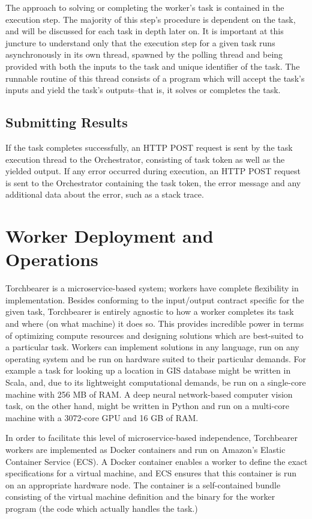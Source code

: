 The approach to solving or completing the worker’s task is contained in the execution step. The majority of this step’s procedure is dependent on the task, and will be discussed for each task in depth later on. It is important at this juncture to understand only that the execution step for a given task runs asynchronously in its own thread, spawned by the polling thread and being provided with both the inputs to the task and unique identifier of the task. The runnable routine of this thread consists of a program which will accept the task’s inputs and yield the task’s outputs--that is, it solves or completes the task. 

\subsection{Submitting Results}

If the task completes successfully, an HTTP POST request is sent by the task execution thread to the Orchestrator, consisting of task token as well as the yielded output. If any error occurred during execution, an HTTP POST request is sent to the Orchestrator containing the task token, the error message and any additional data about the error, such as a stack trace.

\section{Worker Deployment and Operations}
Torchbearer is a microservice-based system; workers have complete flexibility in implementation. Besides conforming to the input/output contract specific for the given task, Torchbearer is entirely agnostic to how a worker completes its task and where (on what machine) it does so. This provides incredible power in terms of optimizing compute resources and designing solutions which are best-suited to a particular task. Workers can implement solutions in any language, run on any operating system and be run on hardware suited to their particular demands. For example a task for looking up a location in GIS database might be written in Scala, and, due to its lightweight computational demands, be run on a single-core machine with 256 MB of RAM. A deep neural network-based computer vision task, on the other hand, might be written in Python and run on a multi-core machine with a 3072-core GPU and 16 GB of RAM.

In order to facilitate this level of microservice-based independence, Torchbearer workers are implemented as Docker containers and run on Amazon’s Elastic Container Service (ECS). A Docker container enables a worker to define the exact specifications for a virtual machine, and ECS ensures that this container is run on an appropriate hardware node. The container is a self-contained bundle consisting of the virtual machine definition and the binary for the worker program (the code which actually handles the task.) 


